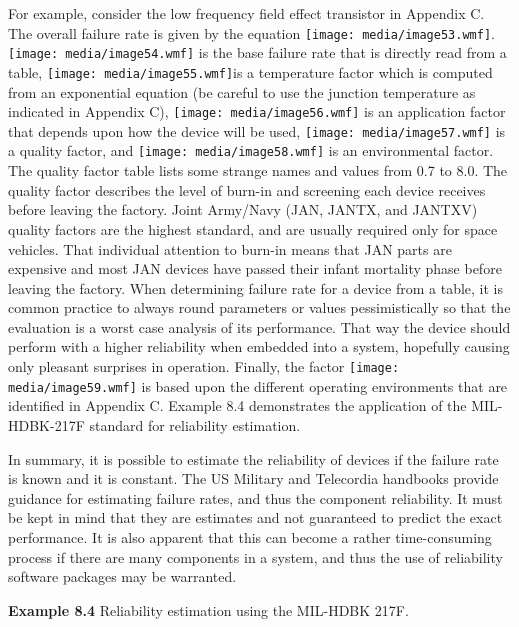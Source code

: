 For example, consider the low frequency field effect transistor in
Appendix C. The overall failure rate is given by the equation
\texttt{[image: media/image53.wmf]}. \texttt{[image: media/image54.wmf]}
is the base failure rate that is directly read from a table,
\texttt{[image: media/image55.wmf]}is a temperature factor which is
computed from an exponential equation (be careful to use the junction
temperature as indicated in Appendix C),
\texttt{[image: media/image56.wmf]} is an application factor that
depends upon how the device will be used,
\texttt{[image: media/image57.wmf]} is a quality factor, and
\texttt{[image: media/image58.wmf]} is an environmental factor. The
quality factor table lists some strange names and values from 0.7 to
8.0. The quality factor describes the level of burn-in and screening
each device receives before leaving the factory. Joint Army/Navy (JAN,
JANTX, and JANTXV) quality factors are the highest standard, and are
usually required only for space vehicles. That individual attention to
burn-in means that JAN parts are expensive and most JAN devices have
passed their infant mortality phase before leaving the factory. When
determining failure rate for a device from a table, it is common
practice to always round parameters or values pessimistically so that
the evaluation is a worst case analysis of its performance. That way the
device should perform with a higher reliability when embedded into a
system, hopefully causing only pleasant surprises in operation. Finally,
the factor \texttt{[image: media/image59.wmf]} is based upon the
different operating environments that are identified in Appendix C.
Example 8.4 demonstrates the application of the MIL-HDBK-217F standard
for reliability estimation.

In summary, it is possible to estimate the reliability of devices if the
failure rate is known and it is constant. The US Military and Telecordia
handbooks provide guidance for estimating failure rates, and thus the
component reliability. It must be kept in mind that they are estimates
and not guaranteed to predict the exact performance. It is also apparent
that this can become a rather time-consuming process if there are many
components in a system, and thus the use of reliability software
packages may be warranted.

\textbf{\hfill\break
Example 8.4} Reliability estimation using the MIL-HDBK 217F.

